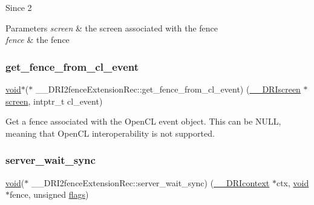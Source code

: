 \begin{DoxySince}{Since}
2
\end{DoxySince}

\begin{DoxyParams}{Parameters}
{\em screen} & the screen associated with the fence \\
\hline
{\em fence} & the fence \\
\hline
\end{DoxyParams}
\mbox{\label{struct_____d_r_i2fence_extension_rec_aab159b47cdc19dbd3e3e05e1e2a8b783}} 
\subsubsection{\texorpdfstring{get\+\_\+fence\+\_\+from\+\_\+cl\+\_\+event}{get\_fence\_from\_cl\_event}}
{\footnotesize\ttfamily \hyperlink{_s_d_l__opengles2__gl2ext_8h_ae5d8fa23ad07c48bb609509eae494c95}{void}$\ast$($\ast$ \+\_\+\+\_\+\+D\+R\+I2fence\+Extension\+Rec\+::get\+\_\+fence\+\_\+from\+\_\+cl\+\_\+event) (\hyperlink{dri__interface_8h_a9961b01d421ee1fd6ed3c05acc9ca561}{\+\_\+\+\_\+\+D\+R\+Iscreen} $\ast$\hyperlink{cad_8h_ae04e09e4e3831bfc1632c509ae37dcec}{screen}, intptr\+\_\+t cl\+\_\+event)}

Get a fence associated with the Open\+CL event object. This can be N\+U\+LL, meaning that Open\+CL interoperability is not supported. \mbox{\label{struct_____d_r_i2fence_extension_rec_af8c4b0fbe199095f333dc026284189b4}} 
\subsubsection{\texorpdfstring{server\+\_\+wait\+\_\+sync}{server\_wait\_sync}}
{\footnotesize\ttfamily \hyperlink{_s_d_l__opengles2__gl2ext_8h_ae5d8fa23ad07c48bb609509eae494c95}{void}($\ast$ \+\_\+\+\_\+\+D\+R\+I2fence\+Extension\+Rec\+::server\+\_\+wait\+\_\+sync) (\hyperlink{dri__interface_8h_a3fd295cba82b5a3d79f1ee7e12bfb908}{\+\_\+\+\_\+\+D\+R\+Icontext} $\ast$ctx, \hyperlink{_s_d_l__opengles2__gl2ext_8h_ae5d8fa23ad07c48bb609509eae494c95}{void} $\ast$fence, unsigned \hyperlink{glcorearb_8h_ac7ba7d3cce3d19ca020e056b37231289}{flags})}

